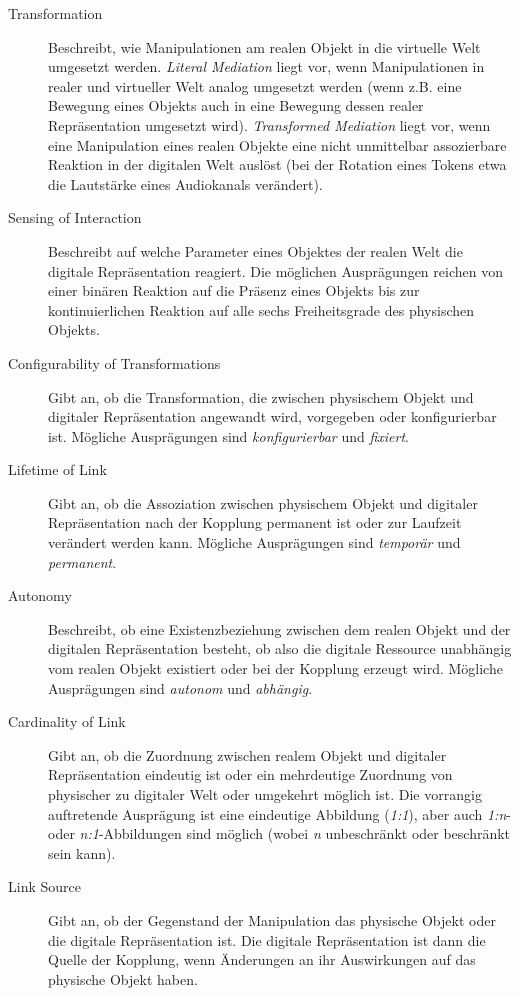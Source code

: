 \begin{description}
	\item[Transformation] Beschreibt, wie Manipulationen am realen Objekt in die virtuelle Welt umgesetzt werden. \emph{Literal Mediation} liegt vor, wenn Manipulationen in realer und virtueller Welt analog umgesetzt werden (wenn z.B. eine Bewegung eines Objekts auch in eine Bewegung dessen realer Repräsentation umgesetzt wird). \emph{Transformed Mediation} liegt vor, wenn eine Manipulation eines realen Objekte eine nicht unmittelbar assozierbare Reaktion in der digitalen Welt auslöst (bei der Rotation eines Tokens etwa die Lautstärke eines Audiokanals verändert).
	\item[Sensing of Interaction] Beschreibt auf welche Parameter eines Objektes der realen Welt die digitale Repräsentation reagiert. Die möglichen Ausprägungen reichen von einer binären Reaktion auf die Präsenz eines Objekts bis zur kontinuierlichen Reaktion auf alle sechs Freiheitsgrade des physischen Objekts.
	\item[Configurability of Transformations] Gibt an, ob die Transformation, die zwischen physischem Objekt und digitaler Repräsentation angewandt wird, vorgegeben oder konfigurierbar ist. Mögliche Ausprägungen sind \emph{konfigurierbar} und \emph{fixiert}.
	\item[Lifetime of Link] Gibt an, ob die Assoziation zwischen physischem Objekt und digitaler Repräsentation nach der Kopplung permanent ist oder zur Laufzeit verändert werden kann. Mögliche Ausprägungen sind \emph{temporär} und \emph{permanent}.
	\item[Autonomy] Beschreibt, ob eine Existenzbeziehung zwischen dem realen Objekt und der digitalen Repräsentation besteht, ob also die digitale Ressource unabhängig vom realen Objekt existiert oder bei der Kopplung erzeugt wird. Mögliche Ausprägungen sind \emph{autonom} und \emph{abhängig}.
	\item[Cardinality of Link] Gibt an, ob die Zuordnung zwischen realem Objekt und digitaler Repräsentation eindeutig ist oder ein mehrdeutige Zuordnung von physischer zu digitaler Welt oder umgekehrt möglich ist. Die vorrangig auftretende Ausprägung ist eine eindeutige Abbildung (\emph{1:1}), aber auch \emph{1:n}- oder \emph{n:1}-Abbildungen sind möglich (wobei \emph{n} unbeschränkt oder beschränkt sein kann).
	\item[Link Source] Gibt an, ob der Gegenstand der Manipulation das physische Objekt oder die digitale Repräsentation ist. Die digitale Repräsentation ist dann die Quelle der Kopplung, wenn Änderungen an ihr Auswirkungen auf das physische Objekt haben.
\end{description}

